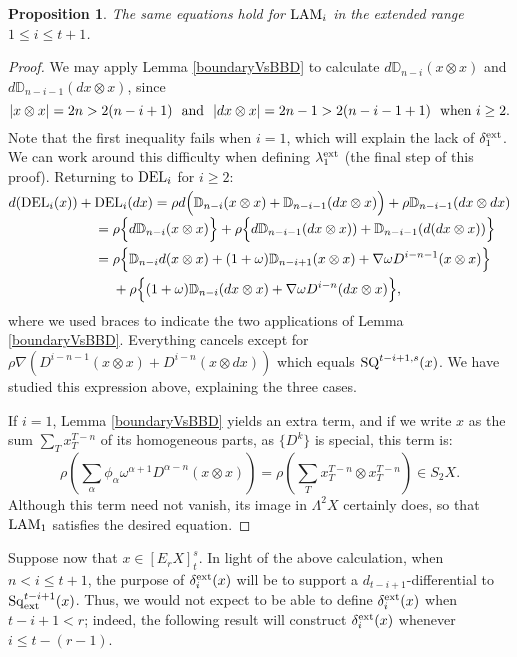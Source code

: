\documentclass[11pt]{amsart} \renewcommand{\baselinestretch}{1.2}
\theoremstyle{plain}
\newtheorem{prop}[thm]{Proposition}
\numberwithin{equation}{section} %
\theoremstyle{plain}
\newtheorem{prop}[thm]{Proposition}
\numberwithin{equation}{chapter} %
\let\oldphi\phi
\let\phi\varphi
\newcommand{\twist}{\omega}
\newcommand{\Nabla}{\nabla}
\newcommand{\Sq}{\mathrm{Sq}}
\newcommand{\Edownup}[5]{[E_{#1}^{#2}#3]^{#4}_{#5}}
\begin{document}
\begin{second quadrant homotopy sseq operations}
\begin{prop}
The same equations hold for $\textup{LAM}_i$ in the extended range $1\leq i\leq t+1$.
\end{prop}
\begin{proof}
We may apply Lemma \ref{boundaryVsBBD} to calculate $d\mathbb{D}_{n-i}(x\otimes x)$ and $d\mathbb{D}_{n-i-1}(dx\otimes x)$, since 
\[|x\otimes x|=2n> 2(n-i+1)\textup{ \ and \ }|dx\otimes x|=2n-1> 2(n-i-1+1) \textup{ \ when $i\geq2$}.\]
Note that the first inequality fails when  $i=1$, which will explain the lack of $\delta^\textup{ext}_1$. We can work around this difficulty when defining $\lambda^\textup{ext}_1$ (the final step of this proof). Returning to $\textup{DEL}_i$ for $i\geq2$:
\begin{alignat*}{2}
d(\textup{DEL}_i(x))+{}& \textup{DEL}_i(dx)
=
\smash{\rho d\Bigl(\mathbb{D}_{n-i}(x\otimes x)+\mathbb{D}_{n-i-1}(dx\otimes x)\Bigr)}+\rho\mathbb{D}_{n-i-1}(dx\otimes dx)%
\\
&=
\rho\Bigl\{d\mathbb{D}_{n-i}(x\otimes x)\Bigr\}+\rho\Bigl\{d\mathbb{D}_{n-i-1}(dx\otimes x))+\mathbb{D}_{n-i-1}(d(dx\otimes x))\Bigr\}%
\\
&=
\rho\Bigl\{\mathbb{D}_{n-i}d(x\otimes x)+(1+\twist)\mathbb{D}_{n-i+1}(x\otimes x)+\Nabla\twist D^{i-n-1}(x\otimes x)\Bigr\}
\\
&\ \ \ \ +\rho\Bigl\{(1+\twist)\mathbb{D}_{n-i}(dx\otimes x)+\Nabla\twist D^{i-n}(dx\otimes x)\Bigr\},
\end{alignat*}
where we used braces to indicate the two applications of Lemma \ref{boundaryVsBBD}.
Everything cancels except for $\rho\Nabla(D^{i-n-1}(x\otimes x)+D^{i-n}(x\otimes dx))$ which equals $\textup{SQ}^{t-i+1,s}(x)$. We have studied this expression above, explaining the three cases.

If $i=1$, Lemma \ref{boundaryVsBBD} yields an extra term,
and if we write $x$ as the sum $\sum_T x_T^{T-n}$ of its homogeneous parts, as $\{D^k\}$ is special, this term is:
\[\rho(\textstyle\sum_{\alpha} \oldphi_{\alpha}\twist^{\alpha+1} D^{\alpha-n}(x\otimes x))=\rho(\textstyle\sum_{T} x_T^{T-n}\otimes x_T^{T-n})\in S_2X.\]
Although this term need not vanish, its image in $\Lambda^2X$ certainly does, so that $\textup{LAM}_1$ satisfies the desired equation.
\end{proof}
Suppose now that $x\in \Edownup{r}{}{X}{s}{t}$. In light of the above calculation, when $n<i\leq t+1$, the purpose of $\delta^\textup{ext}_i(x)$ will be to support a $d_{t-i+1}$-differential to $\Sq_\textup{ext}^{t-i+1}(x)$. Thus, we would not expect to be able to define $\delta^\textup{ext}_i(x)$ when $t-i+1<r$; indeed, the following result will construct $\delta^\textup{ext}_i(x)$ whenever $i\leq t-(r-1)$.


\end{second quadrant homotopy sseq operations}
\end{document}
